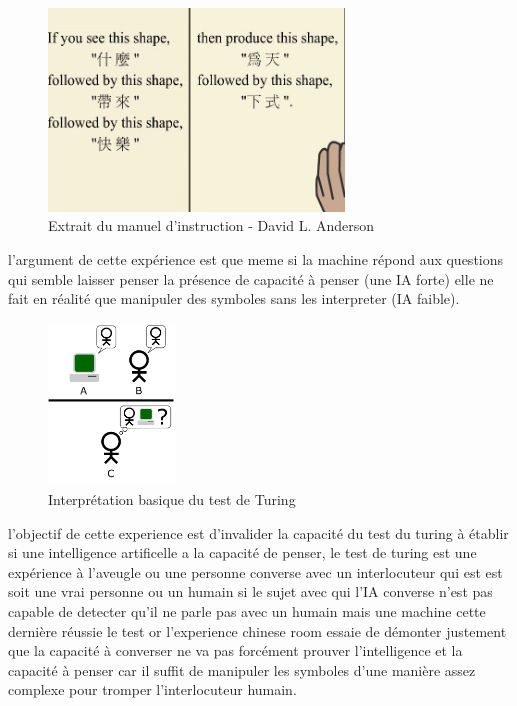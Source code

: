 \begin{figure}[H]
    \centering
    \includegraphics[width=0.7\textwidth]{Images/chineserule}
    \caption{Extrait du manuel d'instruction - David L. Anderson}
	\label{fig:chineseroom}
\end{figure}

l'argument de cette expérience est que meme si la machine répond aux questions qui semble laisser penser
la présence de capacité à penser (une IA forte) elle ne fait en réalité que manipuler des symboles
sans les interpreter (IA faible). \newline

\begin{figure}[h]
    \centering
    \includegraphics[width=0.3\textwidth]{Images/turingtest}
    \caption{Interprétation basique du test de Turing}
    \label{fig:turingtest}
\end{figure}

l'objectif de cette experience est d'invalider la capacité du test du turing à établir si une
intelligence artificelle a la capacité de penser, le test de turing est une expérience à l'aveugle
ou une personne converse avec un interlocuteur qui est est soit une vrai personne ou un humain
si le sujet avec qui l'IA converse n'est pas capable de detecter qu'il ne parle pas avec un humain mais
une machine cette dernière réussie le test or l'experience chinese room essaie de démonter
justement que la capacité à converser ne va pas forcément prouver l'intelligence et la capacité à penser
car il suffit de manipuler les symboles d'une manière assez complexe pour tromper l'interlocuteur humain.
\newline

